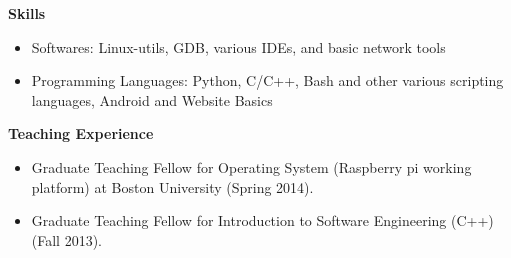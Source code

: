 \documentclass[]{article}
\begin{document}

\noindent \textbf{Skills}
\begin{itemize}
\item Softwares: Linux-utils, GDB, various IDEs, and basic network tools
\item Programming Languages:  Python, C/C++, Bash and other various scripting languages,
Android and Website Basics
\end{itemize}
\noindent \textbf{Teaching Experience}
\begin{itemize}
\item Graduate Teaching Fellow for Operating System (Raspberry pi working
platform) at Boston University (Spring 2014).
\item Graduate Teaching Fellow for Introduction to Software Engineering (C++)
(Fall 2013).
\end{itemize}
\end{document}
